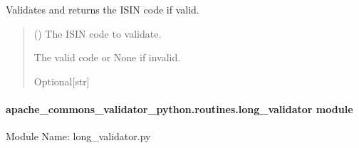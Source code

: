 \documentclass[letterpaper,10pt,english]{sphinxmanual}
\begin{document}
\begin{fulllineitems}

\begin{fulllineitems}
\label{\detokenize{apache_commons_validator_python.routines:id30}}
\pysigstartsignatures
{}
\pysigstopsignatures
\sphinxAtStartPar
Validates and returns the ISIN code if valid.
\begin{quote}\begin{description}
\sphinxAtStartPar
{} () \textendash{} The ISIN code to validate.

\sphinxAtStartPar
The valid code or None if invalid.

\sphinxAtStartPar
Optional{[}str{]}

\end{description}\end{quote}

\end{fulllineitems}


\end{fulllineitems}



\paragraph{apache\_commons\_validator\_python.routines.long\_validator module}
\label{\detokenize{apache_commons_validator_python.routines:module-apache_commons_validator_python.routines.long_validator}}\label{\detokenize{apache_commons_validator_python.routines:apache-commons-validator-python-routines-long-validator-module}}
\sphinxAtStartPar
Module Name: long\_validator.py
\end{document}
